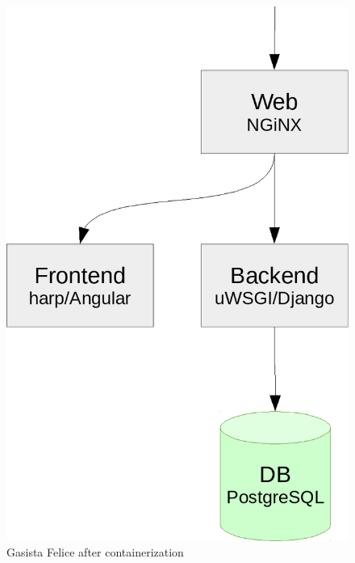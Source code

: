 \begin{figure}[htbp]
\centering
\includegraphics{media/ch3-gf.png}
\caption{Gasista Felice after containerization}
\end{figure}